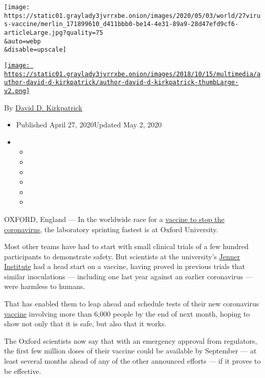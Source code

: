 \texttt{[image: https://static01.graylady3jvrrxbe.onion/images/2020/05/03/world/27virus-vaccine/merlin\_171899610\_d411bbb0-be14-4e31-89a9-28d47efd9cf6-articleLarge.jpg?quality=75\\\&auto=webp\\\&disable=upscale]}

\href{https://www.nytimes3xbfgragh.onion/by/david-d-kirkpatrick}{\texttt{[image: https://static01.graylady3jvrrxbe.onion/images/2018/10/15/multimedia/author-david-d-kirkpatrick/author-david-d-kirkpatrick-thumbLarge-v2.png]}}

By
\href{https://www.nytimes3xbfgragh.onion/by/david-d-kirkpatrick}{David
D. Kirkpatrick}

\begin{itemize}
\item
  Published April 27, 2020Updated May 2, 2020
\item
  \begin{itemize}
  \item
  \item
  \item
  \item
  \item
  \item
  \end{itemize}
\end{itemize}

OXFORD, England --- In the worldwide race for a
\href{https://www.nytimes3xbfgragh.onion/2020/04/08/health/coronavirus-vaccines.html}{vaccine
to stop the coronavirus}, the laboratory sprinting fastest is at Oxford
University.

Most other teams have had to start with small clinical trials of a few
hundred participants to demonstrate safety. But scientists at the
university's \href{https://www.jenner.ac.uk/}{Jenner Institute} had a
head start on a vaccine, having proved in previous trials that similar
inoculations --- including one last year against an earlier coronavirus
--- were harmless to humans.

That has enabled them to leap ahead and schedule tests of their new
coronavirus
\href{https://www.nytimes3xbfgragh.onion/2020/05/15/us/politics/coronavirus-vaccine-timeline.html}{vaccine}
involving more than 6,000 people by the end of next month, hoping to
show not only that it is safe, but also that it works.

The Oxford scientists now say that with an emergency approval from
regulators, the first few million doses of their vaccine could be
available by September --- at least several months ahead of any of the
other announced efforts --- if it proves to be effective.

